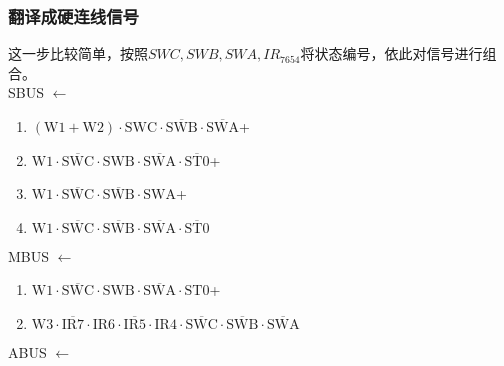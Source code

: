 \documentclass[UTF8]{ctexart}
\begin{document}
\subsubsection{翻译成硬连线信号}
这一步比较简单，按照$SWC, SWB, SWA, IR_{7654}$将状态编号，依此对信号进行组合。\\
\noindent SBUS $\leftarrow$
\begin{enumerate}[\indent\indent]
	\item $(\text{W1} + \text{W2}) \cdot \text{SWC} \cdot \overline{\text{SWB}} \cdot \overline{\text{SWA}}$+
	\item $\text{W1} \cdot \overline{\text{SWC}} \cdot \text{SWB} \cdot \overline{\text{SWA}} \cdot \overline {\text{ST0}}$+
	\item $\text{W1} \cdot \overline{\text{SWC}} \cdot\overline{\text{SWB}}\cdot  \text{SWA}$+
​	\item $\text{W1} \cdot \overline{\text{SWC}} \cdot\overline{\text{SWB}}\cdot \overline{\text{SWA}}\cdot \overline{\text{ST0}} $
\end{enumerate}
MBUS $\leftarrow$
\begin{enumerate}[\indent\indent]
	\item $\text{W1} \cdot \overline{\text{SWC}} \cdot \text{SWB} \cdot \overline{\text{SWA}} \cdot \text{ST0}$+
	\item $\text{W3} \cdot \overline{\text{IR7}} \cdot \text{IR6} \cdot \overline{\text{IR5}} \cdot \text{IR4} \cdot \overline{\text{SWC}} \cdot\overline{\text{SWB}}\cdot \overline{\text{SWA}}$
\end{enumerate}
ABUS $\leftarrow$
\end{document}
